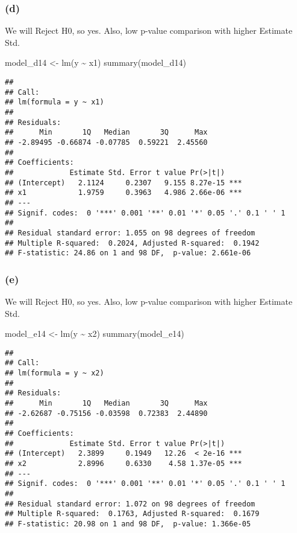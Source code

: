 \documentclass[
]{article}
\newenvironment{Shaded}{\begin{snugshade}}{\end{snugshade}}
\newcommand{\FunctionTok}[1]{\textcolor[rgb]{0.00,0.00,0.00}{#1}}
\newcommand{\NormalTok}[1]{#1}
\newcommand{\OtherTok}[1]{\textcolor[rgb]{0.56,0.35,0.01}{#1}}
\newcommand{\SpecialCharTok}[1]{\textcolor[rgb]{0.00,0.00,0.00}{#1}}
\begin{document}
\hypertarget{d-2}{%
\subsubsection{(d)}\label{d-2}}

We will Reject H0, so yes. Also, low p-value comparison with higher
Estimate Std.

\begin{Shaded}
\begin{Highlighting}[]
\NormalTok{model\_d14 }\OtherTok{\textless{}{-}} \FunctionTok{lm}\NormalTok{(y }\SpecialCharTok{\textasciitilde{}}\NormalTok{ x1)}
\FunctionTok{summary}\NormalTok{(model\_d14)}
\end{Highlighting}
\end{Shaded}

\begin{verbatim}
## 
## Call:
## lm(formula = y ~ x1)
## 
## Residuals:
##      Min       1Q   Median       3Q      Max 
## -2.89495 -0.66874 -0.07785  0.59221  2.45560 
## 
## Coefficients:
##             Estimate Std. Error t value Pr(>|t|)    
## (Intercept)   2.1124     0.2307   9.155 8.27e-15 ***
## x1            1.9759     0.3963   4.986 2.66e-06 ***
## ---
## Signif. codes:  0 '***' 0.001 '**' 0.01 '*' 0.05 '.' 0.1 ' ' 1
## 
## Residual standard error: 1.055 on 98 degrees of freedom
## Multiple R-squared:  0.2024, Adjusted R-squared:  0.1942 
## F-statistic: 24.86 on 1 and 98 DF,  p-value: 2.661e-06
\end{verbatim}

\hypertarget{e-2}{%
\subsubsection{(e)}\label{e-2}}

We will Reject H0, so yes. Also, low p-value comparison with higher
Estimate Std.

\begin{Shaded}
\begin{Highlighting}[]
\NormalTok{model\_e14 }\OtherTok{\textless{}{-}} \FunctionTok{lm}\NormalTok{(y }\SpecialCharTok{\textasciitilde{}}\NormalTok{ x2)}
\FunctionTok{summary}\NormalTok{(model\_e14)}
\end{Highlighting}
\end{Shaded}

\begin{verbatim}
## 
## Call:
## lm(formula = y ~ x2)
## 
## Residuals:
##      Min       1Q   Median       3Q      Max 
## -2.62687 -0.75156 -0.03598  0.72383  2.44890 
## 
## Coefficients:
##             Estimate Std. Error t value Pr(>|t|)    
## (Intercept)   2.3899     0.1949   12.26  < 2e-16 ***
## x2            2.8996     0.6330    4.58 1.37e-05 ***
## ---
## Signif. codes:  0 '***' 0.001 '**' 0.01 '*' 0.05 '.' 0.1 ' ' 1
## 
## Residual standard error: 1.072 on 98 degrees of freedom
## Multiple R-squared:  0.1763, Adjusted R-squared:  0.1679 
## F-statistic: 20.98 on 1 and 98 DF,  p-value: 1.366e-05
\end{verbatim}
\end{document}
